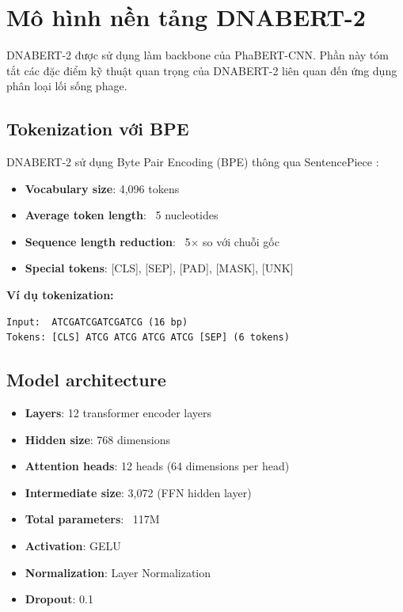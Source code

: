 \section{Mô hình nền tảng DNABERT-2}
\label{sec:dnabert2_detail}

DNABERT-2 \cite{zhou2023dnabert} được sử dụng làm backbone của PhaBERT-CNN. Phần này tóm tắt các đặc điểm kỹ thuật quan trọng của DNABERT-2 liên quan đến ứng dụng phân loại lối sống phage.

\subsection{Tokenization với BPE}

DNABERT-2 sử dụng Byte Pair Encoding (BPE) \cite{sennrich2015neural} thông qua SentencePiece \cite{kudo2018sentencepiece}:

\begin{itemize}
    \item \textbf{Vocabulary size}: 4,096 tokens
    \item \textbf{Average token length}: ~5 nucleotides
    \item \textbf{Sequence length reduction}: ~5× so với chuỗi gốc
    \item \textbf{Special tokens}: [CLS], [SEP], [PAD], [MASK], [UNK]
\end{itemize}

\textbf{Ví dụ tokenization:}
\begin{verbatim}
Input:  ATCGATCGATCGATCG (16 bp)
Tokens: [CLS] ATCG ATCG ATCG ATCG [SEP] (6 tokens)
\end{verbatim}

\subsection{Model architecture}

\begin{itemize}
    \item \textbf{Layers}: 12 transformer encoder layers
    \item \textbf{Hidden size}: 768 dimensions
    \item \textbf{Attention heads}: 12 heads (64 dimensions per head)
    \item \textbf{Intermediate size}: 3,072 (FFN hidden layer)
    \item \textbf{Total parameters}: ~117M
    \item \textbf{Activation}: GELU
    \item \textbf{Normalization}: Layer Normalization
    \item \textbf{Dropout}: 0.1
\end{itemize}

